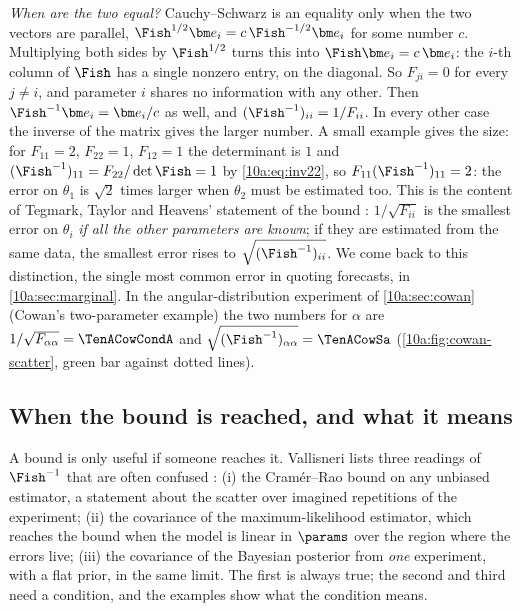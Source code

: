 \emph{When are the two equal?} Cauchy--Schwarz is an equality only when the two vectors are parallel,
$\Fish^{1/2}\bm e_i=c\,\Fish^{-1/2}\bm e_i$ for some number $c$. Multiplying both sides by $\Fish^{1/2}$ turns this into
$\Fish\bm e_i=c\,\bm e_i$: the $i$-th column of $\Fish$ has a single nonzero entry, on the diagonal. So $F_{ji}=0$
for every $j\neq i$, and parameter $i$ shares no information with any other. Then $\Fish^{-1}\bm e_i=\bm e_i/c$ as
well, and $(\Fish^{-1})_{ii}=1/F_{ii}$. In every other case the inverse of the matrix gives the larger number.
A small example gives the size: for $F_{11}=2$, $F_{22}=1$, $F_{12}=1$ the determinant is $1$ and
$(\Fish^{-1})_{11}=F_{22}/\det\Fish=1$ by \eqref{10a:eq:inv22}, so $F_{11}(\Fish^{-1})_{11}=2$: the error on $\theta_1$ is
$\sqrt2$ times larger when $\theta_2$ must be estimated too. This is the content of Tegmark, Taylor and Heavens' statement of the bound \cite{TTH1997}: $1/\sqrt{F_{ii}}$
is the smallest error on $\theta_i$ \emph{if all the other parameters are known}; if they are estimated from
the same data, the smallest error rises to $\sqrt{(\Fish^{-1})_{ii}}$. We come back to this distinction, the
single most common error in quoting forecasts, in \cref{10a:sec:marginal}. In the angular-distribution experiment of \cref{10a:sec:cowan} (Cowan's two-parameter example) the two
numbers for $\alpha$ are $1/\sqrt{F_{\alpha\alpha}}=\TenACowCondA$ and $\sqrt{(\Fish^{-1})_{\alpha\alpha}}=\TenACowSa$
(\cref{10a:fig:cowan-scatter}, green bar against dotted lines).

\subsection{When the bound is reached, and what it means}
\label{10a:sec:cr-reach}

A bound is only useful if someone reaches it. Vallisneri lists three readings of $\Fish^{-1}$ that are often
confused \cite{Vallisneri2008}: (i) the Cram\'er--Rao bound on any unbiased estimator, a statement about the
scatter over imagined repetitions of the experiment; (ii) the covariance of the maximum-likelihood
estimator, which reaches the bound when the model is linear in $\params$ over the region where the errors
live; (iii) the covariance of the Bayesian posterior from \emph{one} experiment, with a flat prior, in the
same limit. The first is always true; the second and third need a condition, and the examples show what the
condition means.

